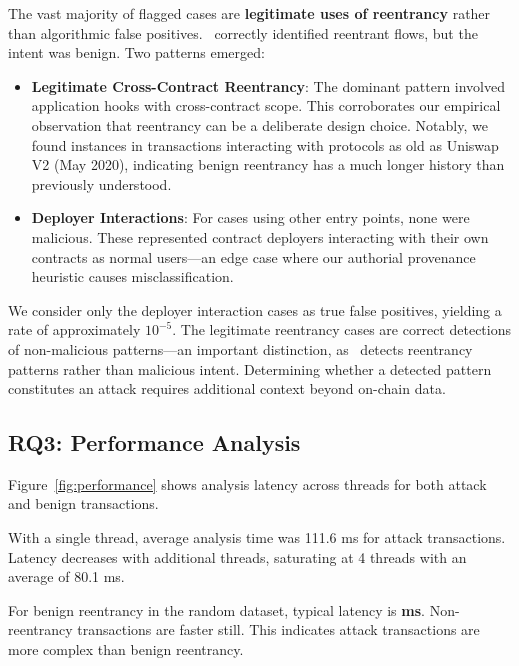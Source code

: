 The vast majority of flagged cases are \textbf{legitimate uses of reentrancy} rather than algorithmic false positives. \ToolName\ correctly identified reentrant flows, but the intent was benign. Two patterns emerged:

\begin{itemize}
    \item \textbf{Legitimate Cross-Contract Reentrancy}: The dominant pattern involved application hooks with cross-contract scope. This corroborates our empirical observation that reentrancy can be a deliberate design choice. Notably, we found instances in transactions interacting with protocols as old as Uniswap V2 (May 2020), indicating benign reentrancy has a much longer history than previously understood.

    \item \textbf{Deployer Interactions}: For  cases using other entry points, none were malicious. These represented contract deployers interacting with their own contracts as normal users---an edge case where our authorial provenance heuristic causes misclassification.
\end{itemize}

We consider only the deployer interaction cases as true false positives, yielding a rate of approximately $10^{-5}$. The legitimate reentrancy cases are correct detections of non-malicious patterns---an important distinction, as \ToolName\ detects reentrancy patterns rather than malicious intent. Determining whether a detected pattern constitutes an attack requires additional context beyond on-chain data.

\subsection{RQ3: Performance Analysis}

Figure~\ref{fig:performance} shows analysis latency across threads for both attack and benign transactions.


With a single thread, average analysis time was 111.6 ms for attack transactions. Latency decreases with additional threads, saturating at 4 threads with an average of 80.1 ms.

For benign reentrancy in the random dataset, typical latency is \textbf{ ms}. Non-reentrancy transactions are faster still. This indicates attack transactions are more complex than benign reentrancy.

